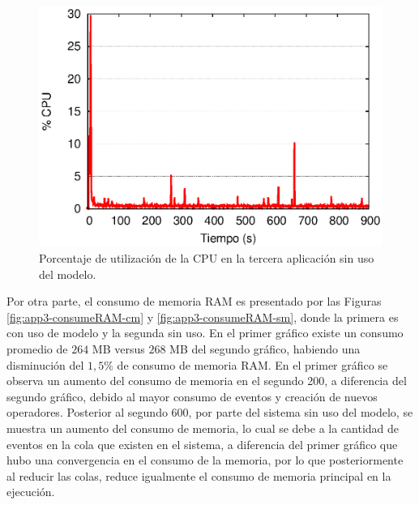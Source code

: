 \begin{figure}[!ht]
\centering
    \includegraphics[scale=0.75]{images/exp/app3/sm/fisical/consumeCPU.eps}
    \caption{Porcentaje de utilizaci\'on de la CPU en la tercera aplicaci\'on sin uso del modelo.}
    \label{fig:app3-consumeCPU-sm}
\end{figure}


Por otra parte, el consumo de memoria RAM es presentado por las Figuras \ref{fig:app3-consumeRAM-cm} y \ref{fig:app3-consumeRAM-sm}, donde la primera es con uso de modelo y la segunda sin uso. En el primer gr\'afico existe un consumo promedio de $264$ MB versus $268$ MB del segundo gr\'afico, habiendo una disminuci\'on del $1,5\%$ de consumo de memoria RAM. En el primer gr\'afico se observa un aumento del consumo de memoria en el segundo 200, a diferencia del segundo gr\'afico, debido al mayor consumo de eventos y creaci\'on de nuevos operadores. Posterior al segundo 600, por parte del sistema sin uso del modelo, se muestra un aumento del consumo de memoria, lo cual se debe a la cantidad de eventos en la cola que existen en el sistema, a diferencia del primer gr\'afico que hubo una convergencia en el consumo de la memoria, por lo que posteriormente al reducir las colas, reduce igualmente el consumo de memoria principal en la ejecuci\'on.


